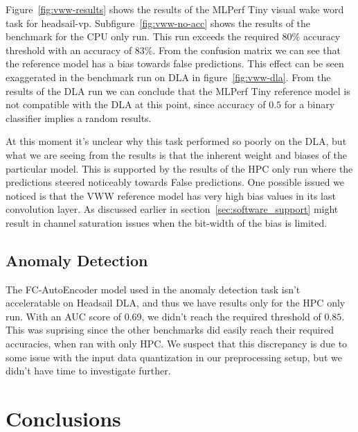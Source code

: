 \documentclass[12pt,a4paper,english
]{tunithesis}
\begin{document}
Figure~\ref{fig:vww-results} shows the results of the MLPerf Tiny visual wake word task for headsail-vp. Subfigure~\ref{fig:vww-no-acc} shows the results of the benchmark for the CPU only run. This run exceeds the required $80\%$ accuracy threshold with an accuracy of $83\%$. From the confusion matrix we can see that the reference model has a bias towards false predictions. This effect can be seen exaggerated in the benchmark run on DLA in figure~\ref{fig:vww-dla}. From the results of the DLA run we can conclude that the MLPerf Tiny reference model is not compatible with the DLA at this point, since accuracy of $0.5$ for a binary classifier implies a random results.

At this moment it's unclear why this task performed so poorly on the DLA, but what we are seeing from the results is that the inherent weight and biases of the particular model. This is supported by the results of the HPC only run where the predictions steered noticeably towards False predictions. One possible issued we noticed is that the VWW reference model has very high bias values in its last convolution layer. As discussed earlier in section~\ref{sec:software_support} might result in channel saturation issues when the bit-width of the bias is limited.

\section{Anomaly Detection}
The FC-AutoEncoder model used in the anomaly detection task isn't acceleratable on Headsail DLA, and thus we have results only for the HPC only run. With an AUC score of 0.69, we didn't reach the required threshold of $0.85$. This was suprising since the other benchmarks did easily reach their required accuracies, when ran with only HPC.  We suspect that this discrepancy is due to some issue with the input data quantization in our preprocessing setup, but we didn't have time to investigate further.

\chapter{Conclusions}
\label{ch:conclusions}
\end{document}
